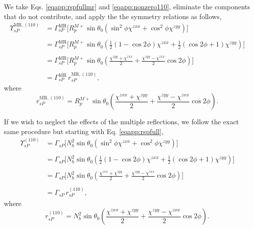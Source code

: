 We take Eqs. \eqref{eqapp:rspfullmr} and \eqref{eqapp:nonzero110}, eliminate the
components that do not contribute, and apply the the symmetry relations as
follows,
\begin{equation*}
\begin{split}
\Upsilon^{\mathrm{MR},(110)}_{sP} &=
\Gamma^{\mathrm{MR}}_{sP}
\big[
R^{M+}_{p}\sin\theta_{0}(\sin^{2}\phi\chi^{zxx} + \cos^{2}\phi\chi^{zyy})
\big]\\\\
&=
\Gamma^{\mathrm{MR}}_{sP}
\bigg[
R^{M+}_{p}\sin\theta_{0}
\left(
\frac{1}{2}(1-\cos2\phi)\chi^{zxx} + \frac{1}{2}(\cos2\phi+1)\chi^{zyy}
\right)
\bigg]\\\\
&=
\Gamma^{\mathrm{MR}}_{sP}
\bigg[
R^{M+}_{p}\sin\theta_{0}
\left(
\frac{\chi^{zyy} + \chi^{zxx}}{2} + \frac{\chi^{zyy} - \chi^{zxx}}{2}\cos2\phi
\right)
\bigg]\\\\
& = \Gamma^{\mathrm{MR}}_{sP}\,r^{\mathrm{MR},(110)}_{sP},
\end{split}
\end{equation*}
where
\begin{equation}\label{eqapp:final-rsp.mr.110}
r^{\mathrm{MR},(110)}_{sP} = 
R^{M+}_{p}\sin\theta_{0}
\left(
\frac{\chi^{zxx} + \chi^{zyy}}{2} + \frac{\chi^{zyy} - \chi^{zxx}}{2}\cos2\phi
\right).
\end{equation}

If we wish to neglect the effects of the multiple reflections, we follow the
exact same procedure but starting with Eq. \eqref{eqapp:rspfull},
\begin{equation*}
\begin{split}
\Upsilon^{(110)}_{sP} &=
\Gamma_{sP}
\big[
N^{2}_{b}\sin\theta_{0}(\sin^{2}\phi\chi^{zxx} + \cos^{2}\phi\chi^{zyy})
\big]\\\\
&=
\Gamma_{sP}
\bigg[
N^{2}_{b}\sin\theta_{0}
\left(
\frac{1}{2}(1-\cos2\phi)\chi^{zxx} + \frac{1}{2}(\cos2\phi+1)\chi^{zyy}
\right)
\bigg]\\\\
&=
\Gamma_{sP}
\bigg[
N^{2}_{b}\sin\theta_{0}
\left(
\frac{\chi^{zxx} + \chi^{zyy}}{2} + \frac{\chi^{zyy} - \chi^{zxx}}{2}\cos2\phi
\right)
\bigg]\\\\
&= \Gamma_{sP}\,r^{(110)}_{sP},
\end{split}
\end{equation*}
where
\begin{equation}\label{eqapp:final-rsp.110}
r^{(110)}_{sP} = 
N^{2}_{b}\sin\theta_{0}
\left(
\frac{\chi^{zxx} + \chi^{zyy}}{2} + \frac{\chi^{zyy} - \chi^{zxx}}{2}\cos2\phi
\right).
\end{equation}


